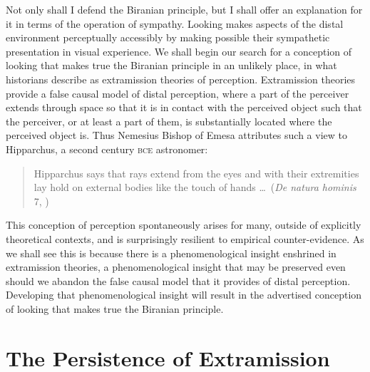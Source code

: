 Not only shall I defend the Biranian principle, but I shall offer an explanation for it in terms of the operation of sympathy. Looking makes aspects of the distal environment perceptually accessibly by making possible their sympathetic presentation in visual experience. We shall begin our search for a conception of looking that makes true the Biranian principle in an unlikely place, in what historians describe as extramission theories of perception. Extramission theories provide a false causal model of distal perception, where a part of the perceiver extends through space so that it is in contact with the perceived object such that the perceiver, or at least a part of them, is substantially located where the perceived object is. Thus Nemesius Bishop of Emesa attributes such a view to Hipparchus, a second century \textsc{bce} astronomer: 
\begin{quote}
	Hipparchus says that rays extend from the eyes and with their extremities lay hold on external bodies like the touch of hands \ldots\ (\emph{De natura hominis} 7, \citealt[104]{Sharples:2008aa})
\end{quote}
This conception of perception spontaneously arises for many, outside of explicitly theoretical contexts, and is surprisingly resilient to empirical counter-evidence. As we shall see this is because there is a phenomenological insight enshrined in extramission theories, a phenomenological insight that may be preserved even should we abandon the false causal model that it provides of distal perception. Developing that phenomenological insight will result in the advertised conception of looking that makes true the Biranian principle.


\section{The Persistence of Extramission} %
\label{sec:the_persistence_of_extramission}

